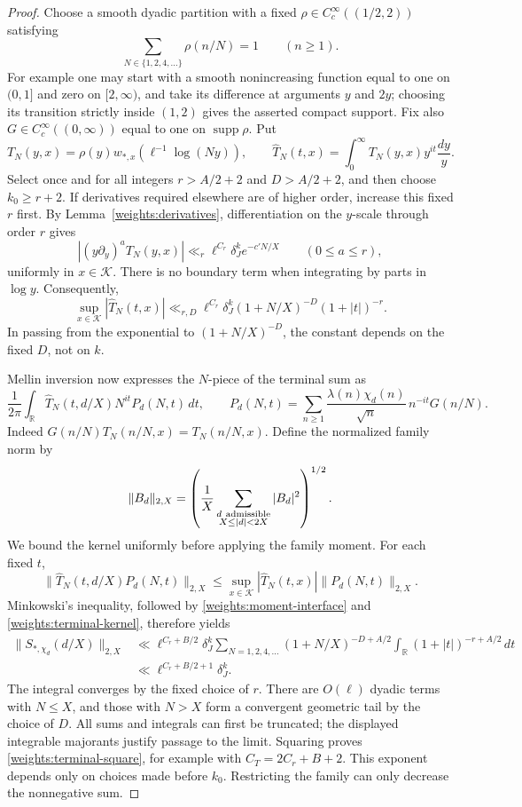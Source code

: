 \begin{proof}
Choose a smooth dyadic partition with a fixed
\(\rho\in C_c^\infty((1/2,2))\) satisfying
\[
 \sum_{N\in\{1,2,4,\ldots\}}\rho(n/N)=1\qquad(n\ge1).
\]
For example one may start with a smooth nonincreasing function
equal to one on \((0,1]\) and zero on \([2,\infty)\), and take
its difference at arguments \(y\) and \(2y\); choosing its
transition strictly inside \((1,2)\) gives the asserted compact
support. Fix also \(G\in C_c^\infty((0,\infty))\) equal to one
on \(\operatorname{supp}\rho\). Put
\[
 T_N(y,x)=\rho(y)w_{*,x}(\ell^{-1}\log(Ny)),\qquad
 \widehat T_N(t,x)=\int_0^\infty T_N(y,x)y^{it}\frac{dy}{y}.
\]
Select once and for all integers \(r>A/2+2\) and \(D>A/2+2\),
and then choose \(k_0\ge r+2\). If derivatives required elsewhere
are of higher order, increase this fixed \(r\) first.
By Lemma~\ref{weights:derivatives}, differentiation on the
\(y\)-scale through order \(r\) gives
\[
 \left|(y\partial_y)^a T_N(y,x)\right|
       \ll_r \ell^{C_r}\delta_J^k e^{-c'N/X}
       \qquad(0\le a\le r),
\]
uniformly in \(x\in\mathcal K\).
There is no boundary term when integrating by parts in \(\log y\).
Consequently,
\begin{equation}
 \sup_{x\in\mathcal K}|\widehat T_N(t,x)|
   \ll_{r,D}\ell^{C_r}\delta_J^k
       (1+N/X)^{-D}(1+|t|)^{-r}.
 \label{weights:terminal-kernel}
\end{equation}
In passing from the exponential to \((1+N/X)^{-D}\), the constant
depends on the fixed \(D\), not on \(k\).

Mellin inversion now expresses the \(N\)-piece of the terminal sum as
\[
 \frac1{2\pi}\int_{\mathbb R}
   \widehat T_N(t,d/X)N^{it}
   P_d(N,t)\,dt,\qquad
 P_d(N,t)=\sum_{n\ge1}\frac{\lambda(n)\chi_d(n)}{\sqrt n}\,
                        n^{-it}G(n/N).
\]
Indeed \(G(n/N)T_N(n/N,x)=T_N(n/N,x)\).
Define the normalized family norm by
\[
 \|B_d\|_{2,X}
   =\left(\frac1X\sum_{\substack{d\ {\rm admissible}\\X\le|d|<2X}}
                      |B_d|^2\right)^{1/2}.
\]
We bound the kernel uniformly before applying the family moment.
For each fixed \(t\),
\[
 \|\widehat T_N(t,d/X)P_d(N,t)\|_{2,X}
   \le \sup_{x\in\mathcal K}|\widehat T_N(t,x)|
                           \|P_d(N,t)\|_{2,X}.
\]
Minkowski's inequality, followed by
\eqref{weights:moment-interface} and
\eqref{weights:terminal-kernel}, therefore yields
\[
 \begin{split}
 \|S_{*,\chi_d}(d/X)\|_{2,X}
 &\ll \ell^{C_r+B/2}\delta_J^k
   \sum_{N=1,2,4,\ldots}(1+N/X)^{-D+A/2}
   \int_{\mathbb R}(1+|t|)^{-r+A/2}\,dt\\
 &\ll \ell^{C_r+B/2+1}\delta_J^k.
 \end{split}
\]
The integral converges by the fixed choice of \(r\).
There are \(O(\ell)\) dyadic terms with \(N\le X\), and those
with \(N>X\) form a convergent geometric tail by the choice of
\(D\). All sums and integrals can first be truncated; the displayed
integrable majorants justify passage to the limit. Squaring proves
\eqref{weights:terminal-square}, for example with
\(C_T=2C_r+B+2\). This exponent depends only on choices made before
\(k_0\). Restricting the family can only decrease the nonnegative
sum.
\end{proof}

